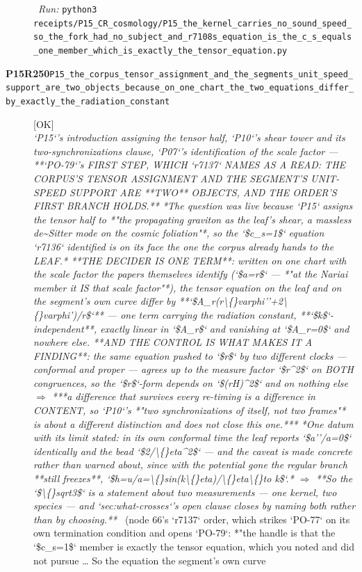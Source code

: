 \begin{description}
\ \emph{Run:} \texttt{python3 receipts/P15\_CR\_cosmology/P15\_the\_kernel\_carries\_no\_sound\_speed\_so\_the\_fork\_had\_no\_subject\_and\_r7108s\_equation\_is\_the\_c\_s\_equals\_one\_member\_which\_is\_exactly\_the\_tensor\_equation.py}
\item[\rcptlabel{P15_the_corpus_tensor_assignment_and_the_segments_unit_speed_support_are_two_objects_because_on_one_chart_the_two_equations_differ_by_exactly_the_radiation_constant}{P15R250}\textbf{P15R250}\quad\texttt{P15\_the\_corpus\_tensor\_assignment\_and\_the\_segments\_unit\_speed\_support\_are\_two\_objects\_because\_on\_one\_chart\_the\_two\_equations\_differ\_by\_exactly\_the\_radiation\_constant}]\hfill\textsf{[OK]}\\
\textit{`P15`'s introduction assigning the tensor half, `P10`'s shear tower and its two-synchronizations clause, `P07`'s identification of the scale factor ---  **`PO-79`'s FIRST STEP, WHICH `r7137` NAMES AS A READ: THE CORPUS'S TENSOR ASSIGNMENT AND THE SEGMENT'S UNIT-SPEED SUPPORT ARE **TWO** OBJECTS, AND THE ORDER'S FIRST BRANCH HOLDS.** *The question was live because `P15` assigns the tensor half to *"the propagating graviton as the leaf's shear, a massless de\textasciitilde{}Sitter mode on the cosmic foliation"*, so the `\$c\_s=1\$` equation `r7136` identified is on its face the one the corpus already hands to the LEAF.*  **THE DECIDER IS ONE TERM**: written on one chart with the scale factor the papers themselves identify (`\$a=r\$` --- *"at the Nariai member it IS that scale factor"*), the tensor equation on the leaf and on the segment's own curve differ by **`\$A\_r(r\textbackslash\{\}varphi''+2\textbackslash\{\}varphi')/r\$`** --- one term carrying the radiation constant, **`\$k\$`-independent**, exactly linear in `\$A\_r\$` and vanishing at `\$A\_r=0\$` and nowhere else.  **AND THE CONTROL IS WHAT MAKES IT A FINDING**: the same equation pushed to `\$r\$` by two different clocks --- conformal and proper --- agrees up to the measure factor `\$r\textasciicircum{}2\$` on BOTH congruences, so the `\$r\$`-form depends on `\$(rH)\textasciicircum{}2\$` and on nothing else \ensuremath{\Rightarrow} ***a difference that survives every re-timing is a difference in CONTENT, so `P10`'s *"two synchronizations of itself, not two frames"* is about a different distinction and does not close this one.***  *One datum with its limit stated: in its own conformal time the leaf reports `\$a''/a=0\$` identically and the bead `\$2/\textbackslash\{\}eta\textasciicircum{}2\$` --- and the caveat is made concrete rather than warned about, since with the potential gone the regular branch **still freezes**, `\$h=u/a=\textbackslash\{\}sin(k\textbackslash\{\}eta)/\textbackslash\{\}eta\textbackslash\{\}to k\$`.* \ensuremath{\Rightarrow} **So the `\$\textbackslash\{\}sqrt3\$` is a statement about two measurements --- one kernel, two species --- and `sec:what-crosses`'s open clause closes by naming both rather than by choosing.**} \ (node 66's `r7137` order, which strikes `PO-77` on its own termination condition and opens `PO-79`: *"the handle is that the `\$c\_s=1\$` member is exactly the tensor equation, which you noted and did not pursue \ldots{} So the equation the segment's own curve 
\end{description}
